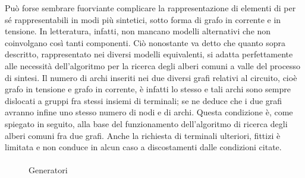 Può forse sembrare fuorviante complicare la rappresentazione di elementi di per sé rappresentabili in modi più sintetici, sotto forma di grafo in corrente e in tensione. In letteratura, infatti, non mancano modelli alternativi che non coinvolgano così tanti componenti. Ciò nonostante va detto che quanto sopra descritto, rappresentato nei diversi modelli equivalenti, si adatta perfettamente alle necessità dell'algoritmo per la ricerca degli alberi comuni a valle del processo di sintesi. Il numero di archi inseriti nei due diversi grafi relativi al circuito, cioè grafo in tensione e grafo in corrente, è infatti lo stesso e tali archi sono sempre dislocati a gruppi fra stessi insiemi di terminali; se ne deduce che i due grafi avranno infine uno stesso numero di nodi e di archi. Questa condizione è, come spiegato in seguito, alla base del funzionamento dell'algoritmo di ricerca degli alberi comuni fra due grafi. Anche la richiesta di terminali ulteriori, fittizi è limitata e non conduce in alcun caso a discostamenti dalle condizioni citate.

\paragraph{}

\begin{figure}[b]
 \centering
 \hspace{50pt}
 \caption{Generatori}
 \label{fig:gens}
\end{figure}

